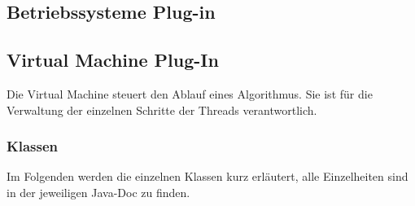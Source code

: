 \documentclass[10pt,a4paper,oneside]{scrbook}
\begin{document}
\subsection{Betriebssysteme Plug-in}







\subsection{Virtual Machine Plug-In}
Die Virtual Machine steuert den Ablauf eines Algorithmus. Sie ist für die Verwaltung der einzelnen
Schritte der Threads verantwortlich.

\subsubsection{Klassen}
Im Folgenden werden die einzelnen Klassen kurz erläutert, alle Einzelheiten sind in der jeweiligen Java-Doc zu finden.
\end{document}
